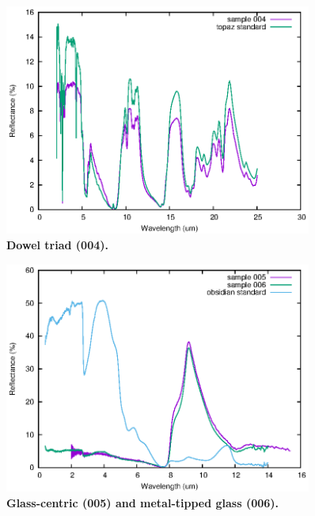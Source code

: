 \documentclass[10pt]{article}
\theoremstyle{definition}
\begin{document}
\begin{figure}
  \includegraphics[angle=0,width=0.9\textwidth]{004.eps}
\caption{\label{fig:004}\textbf{Dowel triad (004).}}
\end{figure}
\begin{figure}
  \includegraphics[angle=0,width=0.9\textwidth]{005-006.eps}
  \caption{\label{fig:005-006}\textbf{Glass-centric (005) and metal-tipped glass (006).}}
\end{figure}
\end{document}
